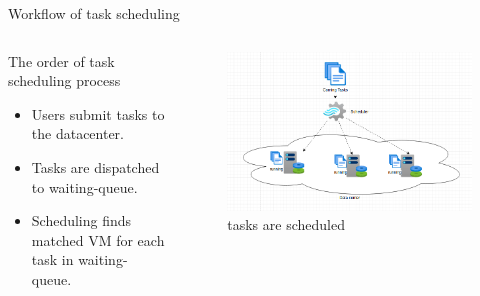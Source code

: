 \documentclass[10pt,xcolor={dvipsnames}, aspectratio=169]{beamer}
\begin{document}
\begin{frame}
{Workflow of task scheduling}
	\begin{columns}[T] %
		\begin{column}{.4\textwidth}
			\begin{block}
			{The order of task scheduling process} 
				\begin{itemize}
					\item Users submit tasks to the datacenter. 
					\item Tasks are dispatched to waiting-queue. 
					\item Scheduling finds matched VM for each task in waiting-queue.
				\end{itemize}
			\end{block}
	\end{column}%
	\hfill%
	\begin{column}{.56\textwidth}
		\begin{figure}
			\centering
			\includegraphics[scale=0.4]{images/coming_tasks.png}
			\caption{tasks are scheduled}
		\end{figure}
	\end{column}%
	\end{columns}
\end{frame}
\end{document}
